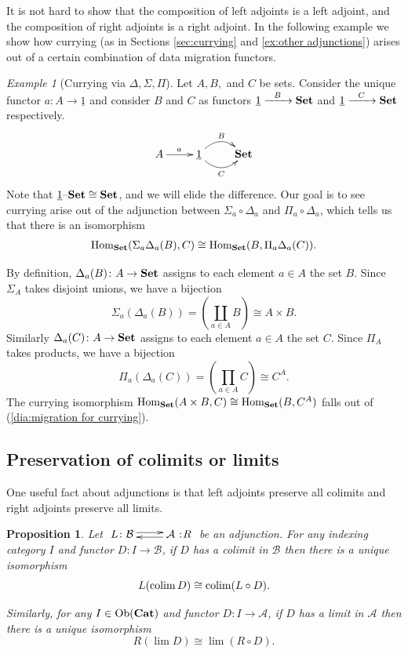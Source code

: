 \documentclass{book}
\makeatletter
\def\tn{\textnormal}
\def\mc{\mathcal}
\def\Hom{\tn{Hom}}
\def\Ob{\tn{Ob}}
\def\to{\rightarrow}
\def\taking{\colon}
\def\iso{\cong}
\def\ul{\underline}
\newcommand{\Too}[1]{\xrightarrow{\ \ #1\ \ }}
\newcommand{\adjoint}[4]{\xymatrix{#1\taking #2\ar@<.5ex>[r]& #3\hspace{1pt}:\hspace{-2pt} #4\ar@<.5ex>[l]}}
\def\Cat{{\bf Cat}}
\def\Set{{\bf Set}}
\def\set{{\text \textendash}{\bf Set}}
\def\colim{\mathop{\tn{colim}}}
\def\mcA{\mc{A}}
\def\mcB{\mc{B}}
\newtheorem{proposition}[subsubsection]{Proposition}
\theoremstyle{remark}
\newtheorem{example}[subsubsection]{Example}
\theoremstyle{definition}
\makeatother
\begin{document}
It is not hard to show that the composition of left adjoints is a left adjoint, and the composition of right adjoints is a right adjoint. In the following example we show how currying (as in Sections \ref{sec:currying} and \ref{ex:other adjunctions}) arises out of a certain combination of data migration functors. 

\begin{example}[Currying via $\Delta,\Sigma,\Pi$]

Let $A,B,$ and $C$ be sets. Consider the unique functor $a\taking A\to\ul{1}$ and consider $B$ and $C$ as functors $\ul{1}\Too{B}\Set$ and $\ul{1}\Too{C}\Set$ respectively. 
$$\xymatrix{A\ar[r]^a&\ul{1}\ar@/^1pc/[r]^B\ar@/_1pc/[r]_C&\Set}$$
Note that $\ul{1}\set\iso\Set$, and we will elide the difference. Our goal is to see currying arise out of the adjunction between $\Sigma_a\circ\Delta_a$ and $\Pi_a\circ\Delta_a$, which tells us that there is an isomorphism
\begin{align}\label{dia:migration for currying}
\Hom_\Set(\Sigma_a\Delta_a(B),C)\iso\Hom_\Set(B,\Pi_a\Delta_a(C)).
\end{align}

By definition, $\Delta_a(B)\taking A\to\Set$ assigns to each element $a\in A$ the set $B$. Since $\Sigma_A$ takes disjoint unions, we have a bijection
$$\Sigma_a(\Delta_a(B))=\left(\coprod_{a\in A}B\right)\iso A\times B.$$ 
Similarly $\Delta_a(C)\taking A\to\Set$ assigns to each element $a\in A$ the set $C$. Since $\Pi_A$ takes products, we have a bijection
$$\Pi_a(\Delta_a(C))=\left(\prod_{a\in A}C\right)\iso C^A.$$
The currying isomorphism $\Hom_\Set(A\times B,C)\iso\Hom_\Set(B,C^A)$ falls out of (\ref{dia:migration for currying}).

\end{example}




\subsection{Preservation of colimits or limits}

One useful fact about adjunctions is that left adjoints preserve all colimits and right adjoints preserve all limits. 

\begin{proposition}

Let $\adjoint{L}{\mcB}{\mcA}{R}$ be an adjunction. For any indexing category $I$ and functor $D\taking I\to\mcB$, if $D$ has a colimit in $\mcB$ then there is a unique isomorphism 
$$L(\colim D)\iso \colim (L\circ D).$$

Similarly, for any $I\in\Ob(\Cat)$ and functor $D\taking I\to\mcA$, if $D$ has a limit in $\mcA$ then there is a unique isomorphism 
$$R(\lim D)\iso \lim (R\circ D).$$

\end{proposition}
\end{document}
